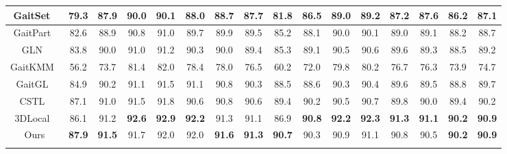 \documentclass[runningheads]{llncs}
\begin{document}
\begin{table*}[htbp]
{\begin{tabular}{cc|c|c|c|c|c|c|c|c|c|c|c|c|c|c}
    \multicolumn{1}{c|}{GaitSet~\cite{aaai2019gaitset}} & 79.3  & 87.9  & 90.0  & 90.1  & 88.0  & 88.7  & 87.7  & 81.8  & 86.5  & 89.0  & 89.2  & 87.2  & 87.6  & 86.2  & 87.1   \\
    \hline
    \multicolumn{1}{c|}{GaitPart~\cite{gaitpart}} & 82.6  & 88.9  & 90.8  & 91.0  & 89.7  & 89.9  & 89.5  & 85.2  & 88.1  & 90.0  & 90.1  & 89.0  & 89.1  & 88.2  & 88.7   \\
    \hline
    \multicolumn{1}{c|}{GLN~\cite{gln}}   & 83.8  & 90.0  & 91.0  & 91.2  & 90.3  & 90.0  & 89.4  & 85.3  & 89.1  & 90.5 & 90.6 & 89.6  & 89.3  & 88.5  & 89.2   \\
    \hline
    \multicolumn{1}{c|}{GaitKMM~\cite{Zhang_2021_CVPR}}   & 56.2  & 73.7  & 81.4  & 82.0  & 78.4  & 78.0  & 76.5  & 60.2  & 72.0  & 79.8  & 80.2  & 76.7  & 76.3  & 73.9  & 74.7  \\
    \hline
    \multicolumn{1}{c|}{GaitGL~\cite{gaitgl}} & 84.9  & 90.2  & 91.1  & 91.5  & 91.1  & 90.8  & 90.3  & 88.5  & 88.6  & 90.3  & 90.4  & 89.6  & 89.5  & 88.8  & 89.7  \\
    \hline
    \multicolumn{1}{c|}{CSTL~\cite{cstl}} & 87.1  & 91.0  & 91.5  & 91.8  & 90.6  & 90.8  & 90.6  & 89.4  & 90.2  & 90.5  & 90.7  & 89.8  & 90.0  & 89.4  & 90.2  \\    
    \hline
     \multicolumn{1}{c|}{3DLocal~\cite{3dlocal}}  & 86.1 & 91.2 & \textbf{92.6} & \textbf{92.9} & \textbf{92.2} & 91.3 & 91.1 & 86.9 & \textbf{90.8} & \textbf{92.2} & \textbf{92.3} & \textbf{91.3} & \textbf{91.1} & \textbf{90.2} & \textbf{90.9} \\
    \hline
     \multicolumn{1}{c|}{Ours}  & \textbf{87.9} & \textbf{91.5} & 91.7 & 92.0 & 92.0 & \textbf{91.6} & \textbf{91.3} & \textbf{90.7} & 90.3 & 90.9 & 91.1 & 90.8 & 90.5 & \textbf{90.2} & \textbf{90.9} \\
     
\hline
    \\


\end{tabular}}
\end{table*}
\end{document}
